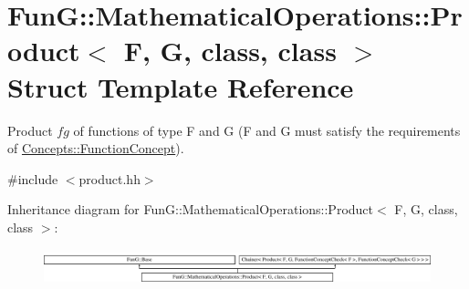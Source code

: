 \hypertarget{structFunG_1_1MathematicalOperations_1_1Product}{\section{Fun\-G\-:\-:Mathematical\-Operations\-:\-:Product$<$ F, G, class, class $>$ Struct Template Reference}
\label{structFunG_1_1MathematicalOperations_1_1Product}
}


Product $fg$ of functions of type F and G (F and G must satisfy the requirements of \hyperlink{structFunG_1_1Concepts_1_1FunctionConcept}{Concepts\-::\-Function\-Concept}).  




{\ttfamily \#include $<$product.\-hh$>$}

Inheritance diagram for Fun\-G\-:\-:Mathematical\-Operations\-:\-:Product$<$ F, G, class, class $>$\-:\begin{figure}[H]
\begin{center}
\leavevmode
\includegraphics[height=1.056604cm]{structFunG_1_1MathematicalOperations_1_1Product}
\end{center}
\end{figure}
